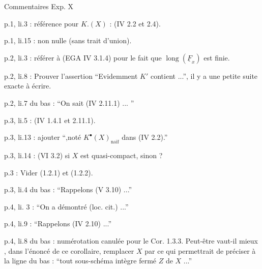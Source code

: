 \begin{center}Commentaires Exp. X\end{center}

p.1, li.3 : référence pour $K.(X)$ : (IV 2.2 et 2.4).

p.1, li.15 : non nulle (sans trait d'union).

p.2, li.3 : référer à (EGA IV 3.1.4) pour le fait que $\operatorname{long}(\underline{F}_x)$ est finie.

p.2, li.8 : Prouver l'assertion ``Evidemment $K'$ contient ...'', il y a une petite suite exacte à écrire.

p.2, li.7 du bas : ``On sait (IV 2.11.1) ... ''

p.3, li.5 : (IV 1.4.1 et 2.11.1).


p.3, li.13 :  ajouter ``,noté $K^{\bullet}(X)_{\text{naïf}}$ dans (IV 2.2).''

p.3, li.14 :  (VI 3.2) si $X$ est quasi-compact, sinon ?

p.3 : Vider (1.2.1) et (1.2.2).

p.3, li.4 du bas : ``Rappelons (V 3.10) ...''

p.4, li. 3 : ``On a démontré (loc. cit.) ...''

p.4, li.9 : ``Rappelons (IV 2.10) ...''

p.4, li.8 du bas : numérotation canulée pour le Cor. 1.3.3. Peut-être vaut-il mieux , dans l'énoncé de ce corollaire, remplacer $X$ par  ce qui permettrait de préciser à la ligne du bas : ``tout sous-schéma intègre fermé $Z$ de $X$ ...''

